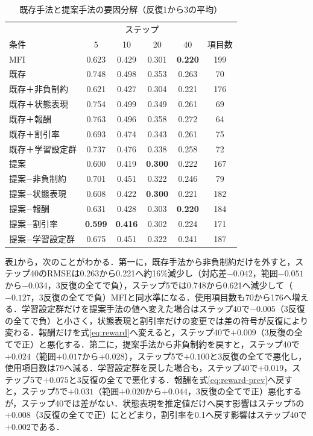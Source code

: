 \documentclass[a4paper,12pt,oneside,openany]{jsbook}
\begin{document}
\begin{table}[t]
\centering
\caption{既存手法と提案手法の要因分解（反復1から3の平均）}
\label{tab:ablation}
\footnotesize
\setlength{\tabcolsep}{3pt}
\begin{tabular}{lccccc}
\hline
 & \multicolumn{4}{c}{ステップ} & \\
条件 & 5 & 10 & 20 & 40 & 項目数\\
\hline
MFI & 0.623 & 0.429 & 0.301 & \textbf{0.220} & 199\\
\hline
既存 & 0.748 & 0.498 & 0.353 & 0.263 & 70\\
既存＋非負制約 & 0.621 & 0.427 & 0.304 & 0.221 & 176\\
既存＋状態表現 & 0.754 & 0.499 & 0.349 & 0.261 & 69\\
既存＋報酬 & 0.763 & 0.496 & 0.358 & 0.272 & 64\\
既存＋割引率 & 0.693 & 0.474 & 0.343 & 0.261 & 75\\
既存＋学習設定群 & 0.737 & 0.476 & 0.338 & 0.258 & 72\\
\hline
提案 & 0.600 & 0.419 & \textbf{0.300} & 0.222 & 167\\
提案−非負制約 & 0.701 & 0.451 & 0.322 & 0.246 & 79\\
提案−状態表現 & 0.608 & 0.422 & \textbf{0.300} & 0.221 & 182\\
提案−報酬 & 0.631 & 0.428 & 0.303 & \textbf{0.220} & 184\\
提案−割引率 & \textbf{0.599} & \textbf{0.416} & 0.302 & 0.224 & 171\\
提案−学習設定群 & 0.675 & 0.451 & 0.322 & 0.241 & 187\\
\hline
\end{tabular}
\end{table}

表\ref{tab:ablation}から，次のことがわかる．第一に，既存手法から非負制約だけを外すと，ステップ40のRMSEは0.263から0.221へ約16\%減少し（対応差$-0.042$，範囲$-0.051$から$-0.034$，3反復の全てで負），ステップ5では0.748から0.621へ減少して（$-0.127$，3反復の全てで負）MFIと同水準になる．使用項目数も70から176へ増える．学習設定群だけを提案手法の値へ変えた場合はステップ40で$-0.005$（3反復の全てで負）と小さく，状態表現と割引率だけの変更では差の符号が反復により変わる．報酬だけを式\eqref{eq:reward}へ変えると，ステップ40で$+0.009$（3反復の全てで正）と悪化する．第二に，提案手法から非負制約を戻すと，ステップ40で$+0.024$（範囲$+0.017$から$+0.028$），ステップ5で$+0.100$と3反復の全てで悪化し，使用項目数は79へ減る．学習設定群を戻した場合も，ステップ40で$+0.019$，ステップ5で$+0.075$と3反復の全てで悪化する．報酬を式\eqref{eq:reward-prev}へ戻すと，ステップ5で$+0.031$（範囲$+0.020$から$+0.044$，3反復の全てで正）悪化するが，ステップ40では差がない．状態表現を推定値だけへ戻す影響はステップ5の$+0.008$（3反復の全てで正）にとどまり，割引率を0.1へ戻す影響はステップ40で$+0.002$である．
\end{document}
